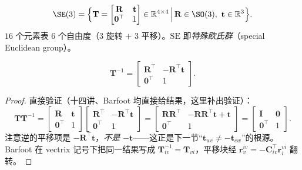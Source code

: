 \begin{definition}[特殊欧氏群 $\SE(3)$]\label{def:se3-rep}
\begin{equation}
  \SE(3)=\Big\{\mathbf{T}=\begin{bmatrix}\mathbf{R}&\mathbf{t}\\\mathbf{0}^\top&1\end{bmatrix}\in\mathbb{R}^{4\times4}\,\Big|\,\mathbf{R}\in\SO(3),\ \mathbf{t}\in\mathbb{R}^3\Big\}.
\end{equation}
$16$ 个元素表 $6$ 个自由度（$3$ 旋转 $+$ $3$ 平移）。$\mathrm{SE}$ 即\emph{特殊欧氏群}（special Euclidean group）。
\end{definition}

\begin{proposition}[$\SE(3)$ 的逆]\label{prop:T-inv}
\begin{equation}
  \mathbf{T}^{-1}=\begin{bmatrix}\mathbf{R}^\top&-\mathbf{R}^\top\mathbf{t}\\\mathbf{0}^\top&1\end{bmatrix}.
  \label{eq:T-inv}
\end{equation}
\end{proposition}
\begin{proof}
直接验证（十四讲、Barfoot 均直接给结果，这里补出验证）：
\[
  \mathbf{T}\mathbf{T}^{-1}=\begin{bmatrix}\mathbf{R}&\mathbf{t}\\\mathbf{0}^\top&1\end{bmatrix}\begin{bmatrix}\mathbf{R}^\top&-\mathbf{R}^\top\mathbf{t}\\\mathbf{0}^\top&1\end{bmatrix}
  =\begin{bmatrix}\mathbf{R}\mathbf{R}^\top&-\mathbf{R}\mathbf{R}^\top\mathbf{t}+\mathbf{t}\\\mathbf{0}^\top&1\end{bmatrix}
  =\begin{bmatrix}\mathbf{I}&\mathbf{0}\\\mathbf{0}^\top&1\end{bmatrix}.
\]
注意逆的平移项是 $-\mathbf{R}^\top\mathbf{t}$，\emph{不是} $-\mathbf{t}$——这正是下一节“$\mathbf{t}_{wc}\neq-\mathbf{t}_{cw}$”的根源。Barfoot 在 vectrix 记号下把同一结果写成 $\mathbf{T}_{iv}^{-1}=\mathbf{T}_{vi}$，平移块经 $\mathbf{r}_v^{iv}=-\mathbf{C}_{iv}^\top\mathbf{r}_i^{vi}$ 翻转\cite{barfoot2024state}。
\end{proof}

